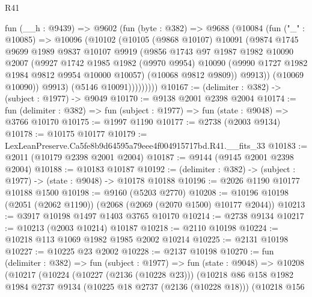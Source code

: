 \begin{lexlean}{R41}
\begin{coremodule}
            fun (__h : @9439) =>
            @9602
              (fun (byte : @382) =>
              @9688
                (@10084
                  (fun ("_" : @10085) =>
                  @10096
                    (@10102
                      (@10105
                        (@9868 @10107)
                        @10091
                        (@9874
                          @1745
                          @9699
                          @1989
                          @9837
                          @10107
                          @9919
                          (@9856
                            @1743
                            @97
                            @1987
                            @1982
                            @10090
                            @2007
                            (@9927
                              @1742
                              @1985
                              @1982
                              (@9970 @9954)
                              @10090
                              (@9990 @1727 @1982 @1984 @9812 @9954 @10000 @10057)
                              (@10068 @9812 @9809))
                            @9913))
                        (@10069 @10090))
                      @9913)
                    (@5146 @10091)))))))))
@10167 := (delimiter : @382) -> (subject : @1977) -> @9049
@10170 := @9138 @2001 @2398 @2004
@10174 := fun (delimiter : @382) => fun (subject : @1977) => fun (state : @9048) => @3766 @10170
@10175 := @1997 @1190
@10177 := @2738 (@2003 @9134)
@10178 := @10175 @10177
@10179 := LexLeanPreserve.Ca5fe8b9d64595a79eee4f004915717bd.R41.__fits_33
@10183 := @2011 (@10179 @2398 @2001 @2004)
@10187 := @9144 (@9145 @2001 @2398 @2004)
@10188 := @10183 @10187
@10192 := (delimiter : @382) -> (subject : @1977) -> (state : @9048) -> @10178 @10188
@10196 := @2026 @1190 @10177 @10188 @1500
@10198 := @9160 (@5203 @2770)
@10208 := @10196 @10198 (@2051 (@2062 @1190)) (@2068 (@2069 (@2070 @1500) @10177 @2044))
@10213 := @3917 @10198 @1497 @1403 @3765 @10170
@10214 := @2738 @9134
@10217 := @10213 (@2003 @10214) @10187
@10218 := @2110 @10198
@10224 := @10218 @113 @1069 @1982 @1985 @2002 @10214
@10225 := @2131 @10198
@10227 := @10225 @23 @2002
@10228 := @2137 @10198
@10270 := fun (delimiter : @382) =>
  fun (subject : @1977) =>
  fun (state : @9048) =>
  @10208
    (@10217
      (@10224
        (@10227 (@2136 (@10228 @23)))
        (@10218
          @86
          @158
          @1982
          @1984
          @2737
          @9134
          (@10225 @18 @2737 (@2136 (@10228 @18)))
          (@10218
            @156

\end{coremodule}
\end{lexlean}
